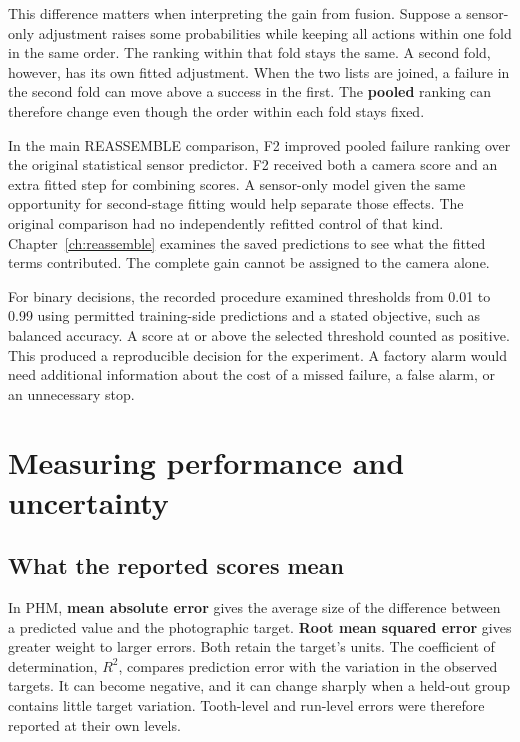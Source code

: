 This difference matters when interpreting the gain from fusion. Suppose a sensor-only
adjustment raises some probabilities while keeping all actions within one fold in the
same order. The ranking within that fold stays the same. A second fold, however, has its
own fitted adjustment. When the two lists are joined, a failure in the second fold can
move above a success in the first. The \textbf{pooled} ranking can therefore change even
though the order within each fold stays fixed.

In the main REASSEMBLE comparison, F2 improved pooled failure ranking over the original
statistical sensor predictor. F2 received both a camera score and an extra fitted step
for combining scores. A sensor-only model given the same opportunity for second-stage
fitting would help separate those effects. The original comparison had no independently
refitted control of that kind. Chapter~\ref{ch:reassemble} examines the saved predictions to see what the
fitted terms contributed. The complete gain cannot be assigned to the camera alone.

For binary decisions, the recorded procedure examined thresholds from 0.01 to 0.99 using
permitted training-side predictions and a stated objective, such as balanced accuracy. A
score at or above the selected threshold counted as positive. This produced a
reproducible decision for the experiment. A factory alarm would need additional
information about the cost of a missed failure, a false alarm, or an unnecessary stop.

\section{Measuring performance and uncertainty}
\label{sec:ch4-metrics}

\subsection{What the reported scores mean}

In PHM, \textbf{mean absolute error} gives the average size of the difference between a
predicted value and the photographic target. \textbf{Root mean squared error} gives
greater weight to larger errors. Both retain the target’s units. The coefficient of
determination, \(R^2\), compares prediction error with the variation in the observed
targets. It can become negative, and it can change sharply when a held-out group
contains little target variation. Tooth-level and run-level errors were therefore
reported at their own levels.

